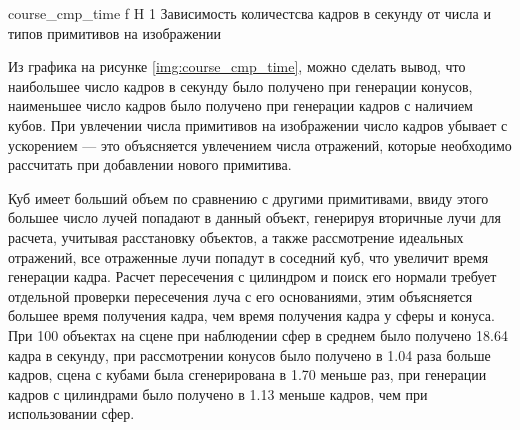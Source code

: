 {course_cmp_time} %
{f} %
{H} %
{1\textwidth} %
{Зависимость количестсва кадров в секунду от числа и типов примитивов на изображении} %

Из графика на рисунке \ref{img:course_cmp_time}, можно сделать вывод, что
наибольшее число кадров в секунду было получено при генерации конусов, наименьшее число кадров было получено при генерации кадров с наличием кубов. При увлечении числа примитивов на изображении число кадров убывает с ускорением --- это объясняется увлечением числа отражений, которые необходимо рассчитать при добавлении нового примитива. 

Куб имеет больший объем по сравнению с другими примитивами, ввиду этого большее число лучей попадают в данный объект, генерируя вторичные лучи для расчета, учитывая расстановку объектов, а также рассмотрение идеальных отражений, все отраженные лучи попадут в соседний куб, что увеличит время генерации кадра. 
Расчет пересечения с цилиндром и поиск его нормали требует отдельной проверки пересечения луча с его основаниями, этим объясняется большее время получения кадра, чем время получения кадра у сферы и конуса. При 100 объектах на сцене при наблюдении сфер в среднем было получено 18.64 кадра в секунду, при рассмотрении конусов было получено в 1.04 раза больше кадров, сцена с кубами была сгенерирована  в 1.70 меньше раз, при генерации кадров с цилиндрами было получено  в 1.13 меньше кадров, чем при использовании сфер.








